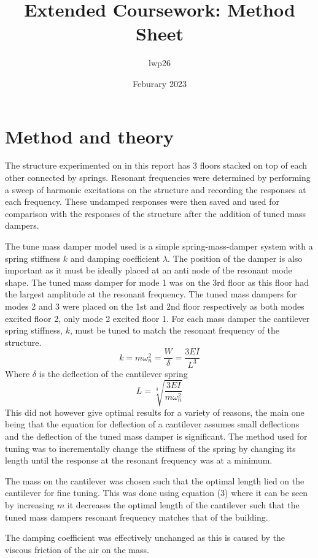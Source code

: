 \documentclass[8pt]{article}
\begin{document}
\title{Extended Coursework: Method Sheet}
\author{lwp26}
\date{Feburary 2023}
\maketitle


\section{Method and theory}

The structure experimented on in this report has 3 floors stacked on top of each other connected by springs.
Resonant frequencies were determined by performing a sweep of harmonic excitations on the structure and recording the responses at each frequency.
These undamped responses were then saved and used for comparison with the responses of the structure after the addition of tuned mass dampers.

The tune mass damper model used is a simple spring-mass-damper system with a spring stiffness $k$ and damping coefficient $\lambda$.
The position of the damper is also important as it must be ideally placed at an anti node of the resonant mode shape.
The tuned mass damper for mode 1 was on the 3rd floor as this floor had the largest amplitude at the resonant frequency.
The tuned mass dampers for modes 2 and 3 were placed on the 1st and 2nd floor respectively as both modes excited floor 2, only mode 2 excited floor 1.
For each mass damper the cantilever spring stiffness, $k$, must be tuned to match the resonant frequency of the structure.
\begin{equation}
    k = m\omega_n^2 = \frac{W}{\delta} = \frac{3EI}{L^3}
\end{equation}
Where $\delta$ is the deflection of the cantilever spring
\begin{equation}
    L = \sqrt[3]{\frac{3EI}{m\omega_n^2}}
\end{equation}
This did not however give optimal results for a variety of reasons, the main one being that the equation for deflection
of a cantilever assumes small deflections and the deflection of the tuned mass damper is significant.
The method used for tuning was to incrementally change the stiffness of the spring by changing its length until the response 
at the resonant frequency was at a minimum. 

The mass on the cantilever was chosen such that the optimal length lied on the cantilever for fine tuning.
This was done using equation (3) where it can be seen by increasing $m$ it decreases the optimal length of the cantilever such 
that the tuned mass dampers resonant frequency matches that of the building.

The damping coefficient was effectively unchanged as this is caused by the viscous friction of the air on the mass.
\end{document}
